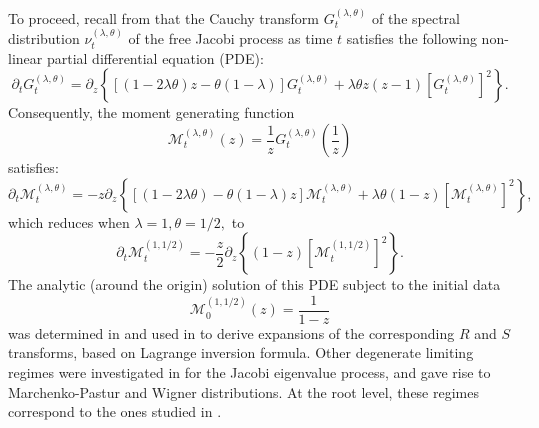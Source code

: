 \documentclass[12pt,reqno]{amsart}
\begin{document}
To proceed, recall from \cite{MR2384475} that the Cauchy transform $G_t^{(\lambda,\theta)}$ of the spectral distribution $\nu_t^{(\lambda,\theta)}$ of the free Jacobi process as time $t$ satisfies the following non-linear partial differential equation (PDE):
\begin{equation*}
	\partial_tG_t^{(\lambda,\theta)} = \partial_z \left\{
	[(1-2\lambda \theta) z -\theta(1-\lambda)]G_t^{(\lambda,\theta)}
	+\lambda \theta z(z-1)[G_t^{(\lambda,\theta)}]^2\right\}.
\end{equation*}
Consequently, the moment generating function
\begin{equation*}
	\mathcal{M}_t^{(\lambda,\theta)}(z) = \frac{1}{z}G_t^{(\lambda,\theta)}\left(\frac{1}{z}\right)
\end{equation*}
satisfies:
\begin{equation}
\label{PDE-MGF}
	\partial_t\mathcal{M}_t^{(\lambda,\theta)} = -z \partial_z \left\{
	[(1-2\lambda \theta)  -\theta(1-\lambda)z]\mathcal{M}_t^{(\lambda,\theta)}
	+\lambda \theta (1-z)[\mathcal{M}_t^{(\lambda,\theta)}]^2\right\},
\end{equation}
which reduces when $\lambda =1, \theta =1/2,$ to 
\begin{equation*}
	\partial_t\mathcal{M}_t^{(1,1/2)} = -\frac{z}{2} \partial_z \left\{(1-z)[\mathcal{M}_t^{(1,1/2)}]^2\right\}.
\end{equation*}
The analytic (around the origin) solution of this PDE subject to the initial data 
\begin{equation*}
\mathcal{M}_0^{(1,1/2)}(z) = \frac{1}{1-z}     
\end{equation*}
was determined in \cite{MR3071702} and used in \cite{MR3679612} to derive expansions of the corresponding $R$ and $S$ transforms, based on Lagrange inversion formula. Other degenerate limiting regimes were investigated in \cite{MR4751304} for the Jacobi eigenvalue process, and gave rise to Marchenko-Pastur and Wigner distributions. 
At the root level, these regimes correspond to the ones studied in \cite{MR1342385}.
\end{document}
